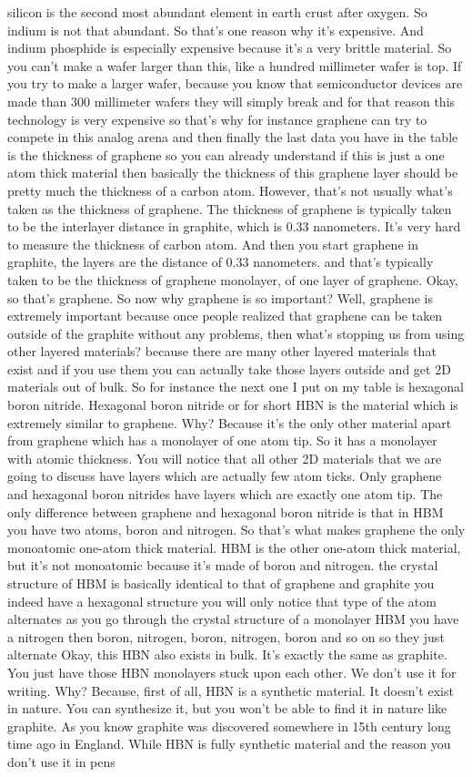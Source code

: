 silicon is the second most abundant element in earth crust after oxygen. So indium is not that abundant. So that's one reason why it's expensive. And indium phosphide is especially expensive because it's a very brittle material. So you can't make a wafer larger than this, like a hundred millimeter wafer is top. If you try to make a larger wafer, because you know that semiconductor devices are made than 300 millimeter wafers they will simply break and for that reason this technology is very expensive so that's why for instance graphene can try to compete in this analog arena and then finally the last data you have in the table is the thickness of graphene so you can already understand if this is just a one atom thick material then basically the thickness of this graphene layer should be pretty much the thickness of a carbon atom. However, that's not usually what's taken as the thickness of graphene. The thickness of graphene is typically taken to be the interlayer distance in graphite, which is 0.33 nanometers. It's very hard to measure the thickness of carbon atom. And then you start graphene in graphite, the layers are the distance of 0.33 nanometers. and that's typically taken to be the thickness of graphene monolayer, of one layer of graphene. Okay, so that's graphene. So now why graphene is so important? Well, graphene is extremely important because once people realized that graphene can be taken outside of the graphite without any problems, then what's stopping us from using other layered materials? because there are many other layered materials that exist and if you use them you can actually take those layers outside and get 2D materials out of bulk. So for instance the next one I put on my table is hexagonal boron nitride. Hexagonal boron nitride or for short HBN is the material which is extremely similar to graphene. Why? Because it's the only other material apart from graphene which has a monolayer of one atom tip. So it has a monolayer with atomic thickness. You will notice that all other 2D materials that we are going to discuss have layers which are actually few atom ticks. Only graphene and hexagonal boron nitrides have layers which are exactly one atom tip. The only difference between graphene and hexagonal boron nitride is that in HBM you have two atoms, boron and nitrogen. So that's what makes graphene the only monoatomic one-atom thick material. HBM is the other one-atom thick material, but it's not monoatomic because it's made of boron and nitrogen. the crystal structure of HBM is basically identical to that of graphene and graphite you indeed have a hexagonal structure you will only notice that type of the atom alternates as you go through the crystal structure of a monolayer HBM you have a nitrogen then boron, nitrogen, boron, nitrogen, boron and so on so they just alternate Okay, this HBN also exists in bulk. It's exactly the same as graphite. You just have those HBN monolayers stuck upon each other. We don't use it for writing. Why? Because, first of all, HBN is a synthetic material. It doesn't exist in nature. You can synthesize it, but you won't be able to find it in nature like graphite. As you know graphite was discovered somewhere in 15th century long time ago in England. While HBN is fully synthetic material and the reason you don't use it in pens 